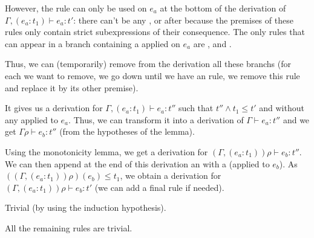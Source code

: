 \documentclass[a4paper]{article}
\theoremstyle{definition}
\begin{document}
\begin{description}
\begin{itemize}
            However, the rule  can only be used on $e_a$ at the bottom of the derivation of $\Gamma,(e_a:t_1) \vdash e_a : t'$:
            there can't be any ,  or  after because the premises of these rules only contain strict subexpressions of their
            consequence. The only rules that can appear in a branch containing a  applied on $e_a$ are ,  and .

            Thus, we can (temporarily) remove from the derivation all these branchs
            (for each  we want to remove, we go down until we have an  rule,
            we remove this  rule and replace it by its other premise).

            It gives us a derivation for $\Gamma,(e_a:t_1) \vdash e_a : t''$ such that $t''\land t_1 \leq t'$ and without any  applied to $e_a$.
            Thus, we can transform it into a derivation of $\Gamma \vdash e_a : t''$ and we get $\Gamma\rho \vdash e_b : t''$ (from the hypotheses of the lemma).

            Using the monotonicity lemma, we get a derivation for $(\Gamma,(e_a:t_1))\rho\vdash e_b : t''$.
            We can then append at the end of this derivation an  with a  (applied to $e_b$).
            As $((\Gamma,(e_a:t_1))\rho)(e_b) \leq t_1$, we obtain a derivation
            for $(\Gamma,(e_a:t_1))\rho\vdash e_b : t'$ (we can add a final  rule if needed).
            
          \end{itemize}

          \item[\Rule{PTypeof}] Trivial (by using the induction hypothesis).
          \item[\Rule{P$\cdots$}] All the remaining rules are trivial.
        \end{description}
\end{document}
